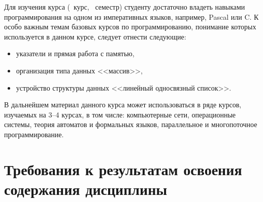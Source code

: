 	\ssect %
Для изучения курса \thecourse{} (\theyearofstudy~курс, \theterm~семестр)
студенту достаточно владеть навыками программирования на одном из императивных языков, например, Pascal или C. К особо важным темам базовых курсов по программированию, понимание которых используется в данном курсе, следует отнести следующие:
\begin{itemize}
	\item указатели и прямая работа с памятью,
	\item организация типа данных <<массив>>,
	\item устройство структуры данных <<линейный односвязный список>>.
\end{itemize}

	\ssect
В дальнейшем материал данного курса может использоваться в ряде курсов,
изучаемых на 3--4 курсах, в том числе: компьютерные сети, операционные системы, теория автоматов и формальных языков, параллельное и многопоточное
программирование.

\section{Требования к результатам освоения содержания дисциплины}

